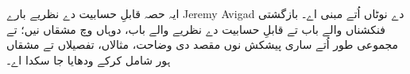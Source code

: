 \documentclass[../../include/open-logic-part]{subfiles}
\begin{document}

\begin{editorial}
  ایہ حصہ قابلِ حسابیت دے نظریے بارے Jeremy Avigad دے نوٹاں
  اُتے مبنی اے۔ بازگشتی فنکشناں والے باب تے قابلِ حسابیت
  دے نظریے والے باب، دوہاں وچ مشقاں نیں؛ تے مجموعی طور اُتے ساری پیشکش نوں مقصد دی
  وضاحت، مثالاں، تفصیلاں تے مشقاں ہور شامل کرکے ودھایا جا سکدا اے۔
\end{editorial}



\OLEndPartHook
\end{document}
